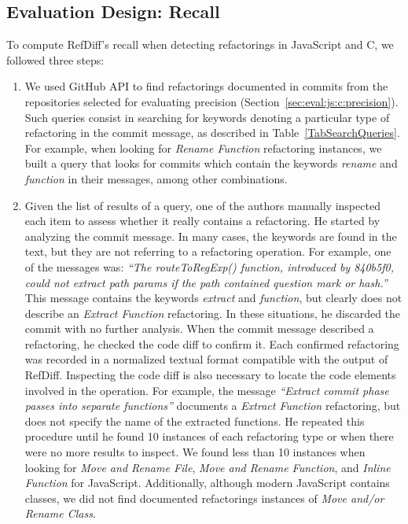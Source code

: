 \documentclass[10pt,journal,compsoc]{IEEEtran}
\begin{document}
\subsection{Evaluation Design: Recall}
\label{sec:eval:js:c:recall}


To compute RefDiff's recall when detecting refactorings in JavaScript and C, we followed three steps:

\begin{enumerate}  
\item We used GitHub API to find refactorings documented in commits from the repositories selected for evaluating precision (Section~\ref{sec:eval:js:c:precision}). Such queries consist in searching for keywords denoting a particular type of refactoring in the commit message, as described in Table~\ref{TabSearchQueries}. For example, when looking for \emph{Rename Function} refactoring instances, we built a query that looks for commits which contain the keywords \textit{rename} and \textit{function} in their messages, among other combinations.

\item Given the list of results of a query, one of the authors manually inspected each item to assess whether it really contains a refactoring. He started by analyzing the commit message. 
In many cases, the keywords are found in the text, but they are not referring to a refactoring operation.
For example, one of the messages was: \textit{``The routeToRegExp() function, introduced by 840b5f0, could not extract path params if the path contained question mark or hash.''}
This message contains the keywords \textit{extract} and \textit{function}, but clearly does not describe an \emph{Extract Function} refactoring.
In these situations, he discarded the commit with no further analysis.
When the commit message described a refactoring, he checked the code diff to confirm it.
Each confirmed refactoring was recorded in a normalized textual format compatible with the output of RefDiff.
Inspecting the code diff is also necessary to locate the code elements involved in the operation.
For example, the message \textit{``Extract commit phase passes into separate functions''} documents a \emph{Extract Function} refactoring, but does not specify the name of the extracted functions.
He repeated this procedure until he found 10 instances of each refactoring type or when there were no more results to inspect. We found less than 10 instances when looking for \emph{Move and Rename File}, \emph{Move and Rename Function}, and \emph{Inline Function} for JavaScript. Additionally, although modern JavaScript contains classes, we did not find documented refactorings instances of \emph{Move and/or Rename Class}.




\end{enumerate}
\end{document}
